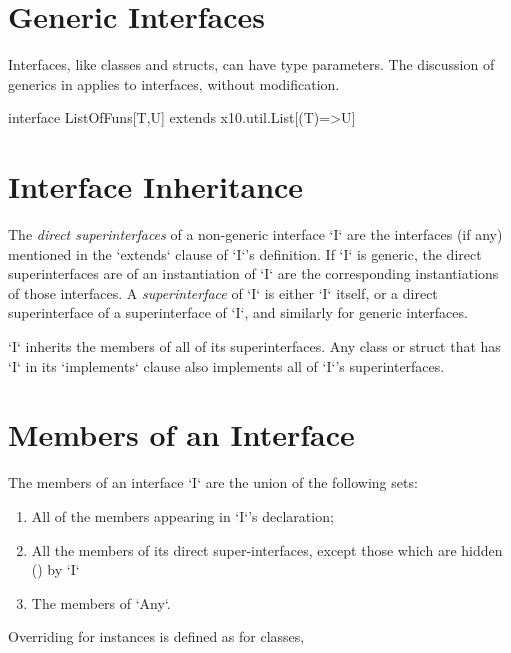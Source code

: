 \section{Generic Interfaces}

Interfaces, like classes and structs, can have type parameters.  
The discussion of generics in  applies to interfaces,
without modification.

\begin{ex}
\begin{xten}
interface ListOfFuns[T,U] extends x10.util.List[(T)=>U] {}
\end{xten}
%

\end{ex}

\section{Interface Inheritance}

The {\em direct superinterfaces} of a non-generic interface \xcd`I` are the interfaces
(if any) mentioned in the \xcd`extends` clause of \xcd`I`'s definition.
If \xcd`I`  is generic, the direct superinterfaces are of an instantiation of
\xcd`I` are the corresponding instantiations of those interfaces.
A {\em superinterface} of \xcd`I` is either \xcd`I` itself, or a direct
superinterface of a superinterface of \xcd`I`, and similarly for generic
interfaces.    

\xcd`I` inherits the members of all of its superinterfaces. Any class or
struct that has \xcd`I` in its \xcd`implements` clause also implements all of
\xcd`I`'s superinterfaces. 






\section{Members of an Interface}

The members of an interface \xcd`I` are the union of the following sets: 
\begin{enumerate}
\item All of the members appearing in \xcd`I`'s declaration;
\item All the members of its direct super-interfaces, except those which are
      hidden () by \xcd`I`
\item The members of \xcd`Any`.
\end{enumerate}

Overriding for instances is defined as for classes, 
